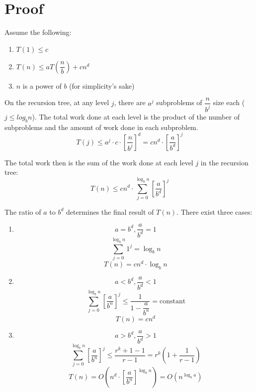 \documentclass[11pt]{article}
\begin{document}
\section{Proof}
	Assume the following:
	\begin{enumerate}
		\item $T(1)\leq c$
		\item $T(n)\leq aT\left(\dfrac{n}{b}\right) + cn^d$
		\item $n$ is a power of $b$ (for simplicity's sake)
	\end{enumerate}
	
	On the recursion tree, at any level $j$, there are $a^j$ subproblems of $\dfrac{n}{b^j}$ size each ($j\leq log_b n$). The total work done at each level is the product of the number of subproblems and the amount of work done in each subproblem.
	\begin{equation}
		T(j)\leq a^j\cdot c\cdot\left[\frac{n}{b^j}\right]^d = cn^d\cdot\left[\frac{a}{b^d}\right]^j
	\end{equation}
	
	The total work then is the sum of the work done at each level $j$ in the recursion tree:
	\begin{equation}
		T(n)\leq cn^d\cdot \sum_{j=0}^{\log_b n}\left[\frac{a}{b^d}\right]^j
	\end{equation}
	
	The ratio of $a$ to $b^d$ determines the final result of $T(n)$. There exist three cases:
	
	\begin{enumerate}
		\item
			\[a=b^d, \frac{a}{b^d} = 1\]
			\[\sum_{j=0}^{\log_b n}1^j = \log_b n\]
			\begin{equation}
				T(n) = cn^d\cdot\log_b n
			\end{equation}
		\item
			\[a<b^d, \frac{a}{b^d}<1\]
			\[\sum_{j=0}^{\log_b n}\left[\frac{a}{b^n}\right]^j \leq \dfrac{1}{1 - \dfrac{a}{b^n}} = \text{constant}\]
			\begin{equation}
				T(n) = cn^d
			\end{equation}
		\item
			\[a>b^d, \frac{a}{b^d} > 1\]
			\[\sum_{j=0}^{\log_b n}\left[\frac{a}{b^n}\right]^j \leq \frac{r^k+1 -1}{r-1} = r^k\left(1 + \frac{1}{r-1}\right)\]
			\begin{equation}
				T(n)=O\left(n^d\cdot\left[\frac{a}{b^n}\right]^{\log_b n}\right) = O(n^{\log_b a})
			\end{equation}
	\end{enumerate}
	
\end{document}
